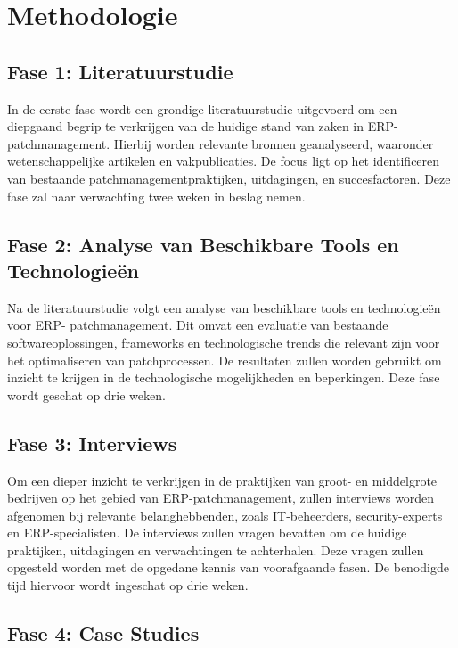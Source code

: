 \section{Methodologie}%
\label{sec:methodologie}

\subsection{Fase 1: Literatuurstudie}

In de eerste fase wordt een grondige literatuurstudie uitgevoerd om een diepgaand begrip te verkrijgen van de huidige stand van zaken in ERP-patchmanagement. Hierbij worden relevante bronnen geanalyseerd, waaronder wetenschappelijke artikelen en vakpublicaties. De focus ligt op het identificeren van bestaande patchmanagementpraktijken, uitdagingen, en succesfactoren. Deze fase zal naar verwachting twee weken in beslag nemen.

\subsection{Fase 2: Analyse van Beschikbare Tools en Technologieën}

Na de literatuurstudie volgt een analyse van beschikbare tools en technologieën voor ERP- patchmanagement. Dit omvat een evaluatie van bestaande softwareoplossingen, frameworks en technologische trends die relevant zijn voor het optimaliseren van patchprocessen. De resultaten zullen worden gebruikt om inzicht te krijgen in de technologische mogelijkheden en beperkingen. Deze fase wordt geschat op drie weken.

\subsection{Fase 3: Interviews}

Om een dieper inzicht te verkrijgen in de praktijken van groot- en middelgrote bedrijven op het gebied van ERP-patchmanagement, zullen interviews worden afgenomen bij relevante belanghebbenden, zoals IT-beheerders, security-experts en ERP-specialisten. De interviews zullen vragen bevatten om de huidige praktijken, uitdagingen en verwachtingen te achterhalen. Deze vragen zullen opgesteld worden met de opgedane kennis van voorafgaande fasen. De benodigde tijd hiervoor wordt ingeschat op drie weken.

\subsection{Fase 4: Case Studies}


